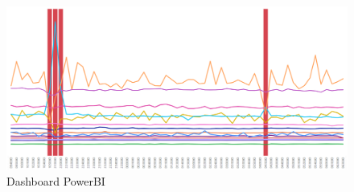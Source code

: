 \begin{figure}[t]
	\centering
	\includegraphics[width=14cm, scale=1]{images/powerbi}
	\caption{Dashboard PowerBI}
	\label{powerbi}
\end{figure}